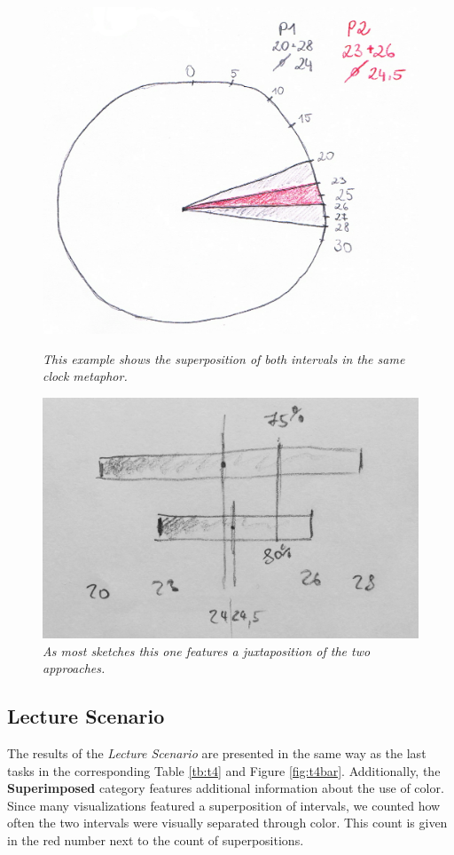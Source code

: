 	\begin{figure}[H]
		\begin{minipage}{.55\textwidth}
			\centering
			\captionsetup{width=0.8\textwidth}
			\includegraphics[height=0.5\textwidth]{figures/superimposed.png}
			\caption{\textit{This example shows the superposition of both intervals in the same clock metaphor.}}
			\label{fig:superimposed}
		\end{minipage}
		\begin{minipage}{.5\textwidth}
			\centering
			\captionsetup{width=1.0\textwidth}
			\includegraphics[height=0.5\textwidth]{figures/juxtaposed.jpg}
			\caption{\textit{As most sketches this one features a juxtaposition of the two approaches.}}
			\label{fig:juxtaposed}
		\end{minipage}
	\end{figure}



\subsection*{Lecture Scenario}
The results of the \textit{Lecture Scenario} are presented in the same way as the last tasks in the corresponding Table \ref{tb:t4} and Figure \ref{fig:t4bar}. Additionally, the \textbf{Superimposed} category features additional information about the use of color. Since many visualizations featured a superposition of intervals, we counted how often the two intervals were visually separated through color. This count is given in the red number next to the count of superpositions.


